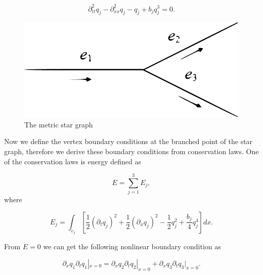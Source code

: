 \documentclass[12pt]{llncs}
\begin{document}
\begin{equation}
\partial_{tt}^2 q_j - \partial_{xx}^2 q_j - q_j + b_{j} q_{j}^3 =
0.\label{kgeq1}
\end{equation}

\begin{figure}[htb]
  \centering

\includegraphics[width=0.5\linewidth]{StarGraph.pdf} %
%
  \caption{The metric star graph}\label{pic1}
\end{figure}

Now we define the vertex boundary conditions at the branched point
of the star graph, therefore we derive these boundary conditions
from conservation laws. One of the conservation laws is energy defined as

\begin{equation}
E = \sum_{j=1}^3 E_j,\label{conl1}
\end{equation}
where

\begin{equation}
E_j= \int _{e_j} \left[ \frac{1}{2} (\partial_t q_j)^2 +
\frac{1}{2} (\partial_x q_j)^2 - \frac{1}{2} q_j^2 + \frac{b_j}{4}
q_j^4 \right] dx.\label{energy1}
\end{equation}

From $\dot{E}=0$ we can get the following nonlinear boundary
condition as

\begin{equation}
\partial_x q_1 \partial_t q_1 |_{x=0} = \partial_x q_2 \partial_t q_2 |_{x=0} + \partial_x q_3 \partial_t q_3|_{x=0}.\label{nbc1}
\end{equation}
\end{document}
